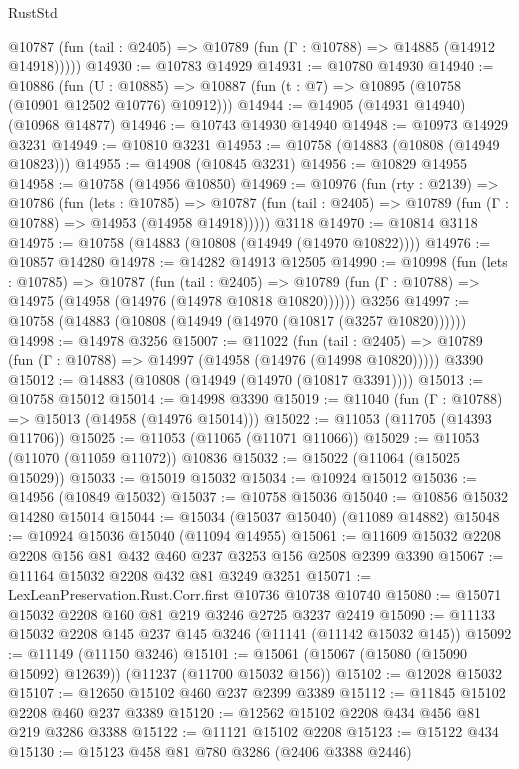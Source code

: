 \begin{lexlean}{RustStd}
\begin{coremodule}
      @10787 (fun (tail : @2405) => @10789 (fun (Γ : @10788) => @14885 (@14912 @14918)))))
@14930 := @10783 @14929
@14931 := @10780 @14930
@14940 := @10886
    (fun (U : @10885) => @10887 (fun (t : @7) => @10895 (@10758 (@10901 @12502 @10776) @10912)))
@14944 := @14905 (@14931 @14940) (@10968 @14877)
@14946 := @10743 @14930 @14940
@14948 := @10973 @14929 @3231
@14949 := @10810 @3231
@14953 := @10758 (@14883 (@10808 (@14949 @10823)))
@14955 := @14908 (@10845 @3231)
@14956 := @10829 @14955
@14958 := @10758 (@14956 @10850)
@14969 := @10976
    (fun (rty : @2139) =>
    @10786
      (fun (lets : @10785) =>
      @10787 (fun (tail : @2405) => @10789 (fun (Γ : @10788) => @14953 (@14958 @14918)))))
    @3118
@14970 := @10814 @3118
@14975 := @10758 (@14883 (@10808 (@14949 (@14970 @10822))))
@14976 := @10857 @14280
@14978 := @14282 @14913 @12505
@14990 := @10998
    (fun (lets : @10785) =>
    @10787
      (fun (tail : @2405) =>
      @10789 (fun (Γ : @10788) => @14975 (@14958 (@14976 (@14978 @10818 @10820))))))
    @3256
@14997 := @10758 (@14883 (@10808 (@14949 (@14970 (@10817 (@3257 @10820))))))
@14998 := @14978 @3256
@15007 := @11022
    (fun (tail : @2405) => @10789 (fun (Γ : @10788) => @14997 (@14958 (@14976 (@14998 @10820)))))
    @3390
@15012 := @14883 (@10808 (@14949 (@14970 (@10817 @3391))))
@15013 := @10758 @15012
@15014 := @14998 @3390
@15019 := @11040 (fun (Γ : @10788) => @15013 (@14958 (@14976 @15014)))
@15022 := @11053 (@11705 (@14393 @11706))
@15025 := @11053 (@11065 (@11071 @11066))
@15029 := @11053 (@11070 (@11059 @11072)) @10836
@15032 := @15022 (@11064 (@15025 @15029))
@15033 := @15019 @15032
@15034 := @10924 @15012
@15036 := @14956 (@10849 @15032)
@15037 := @10758 @15036
@15040 := @10856 @15032 @14280 @15014
@15044 := @15034 (@15037 @15040) (@11089 @14882)
@15048 := @10924 @15036 @15040 (@11094 @14955)
@15061 := @11609 @15032 @2208 @2208 @156 @81 @432 @460 @237 @3253 @156 @2508 @2399 @3390
@15067 := @11164 @15032 @2208 @432 @81 @3249 @3251
@15071 := LexLeanPreservation.Rust.Corr.first @10736 @10738 @10740
@15080 := @15071 @15032 @2208 @160 @81 @219 @3246 @2725 @3237 @2419
@15090 := @11133 @15032 @2208 @145 @237 @145 @3246 (@11141 (@11142 @15032 @145))
@15092 := @11149 (@11150 @3246)
@15101 := @15061 (@15067 (@15080 (@15090 @15092) @12639)) (@11237 (@11700 @15032 @156))
@15102 := @12028 @15032
@15107 := @12650 @15102 @460 @237 @2399 @3389
@15112 := @11845 @15102 @2208 @460 @237 @3389
@15120 := @12562 @15102 @2208 @434 @456 @81 @219 @3286 @3388
@15122 := @11121 @15102 @2208
@15123 := @15122 @434
@15130 := @15123 @458 @81 @780 @3286 (@2406 @3388 @2446)

\end{coremodule}
\end{lexlean}
